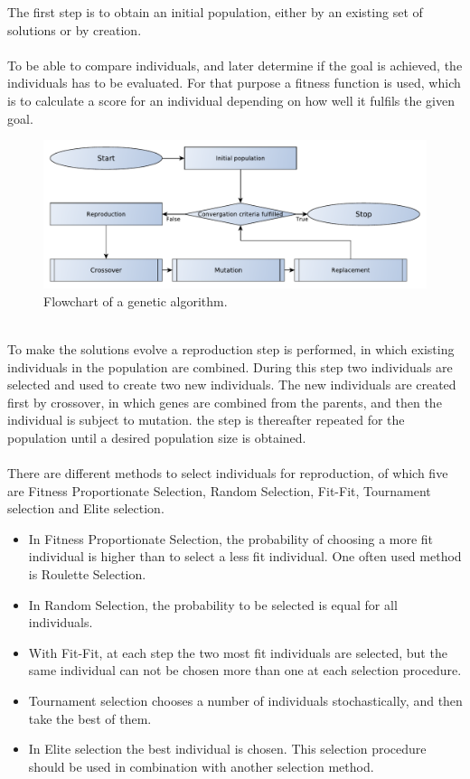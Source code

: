The first step is to obtain an initial population, either by an existing set of solutions or by creation.\\\\
To be able to compare individuals, and later determine if the goal is achieved, the individuals has to be evaluated. For that purpose a fitness function is used, which is to calculate a score for an individual depending on how well it fulfils the given goal.
\begin{figure}[!htb]
	\centering
	\includegraphics[width=\textwidth]{chapter_4_methods/GeneticFlowChart-Generic}
  	\caption[Flowchart of a genetic algorithm]
  	{Flowchart of a genetic algorithm.}
	\label{GeneticFlowChart-generic}
\end{figure}
\\To make the solutions evolve a reproduction step is performed, in which existing individuals in the population are combined. During this step two individuals are selected and used to create two new individuals. The new individuals are created first by crossover, in which genes are combined from the parents, and then the individual is subject to mutation. the step is thereafter repeated for the population until a desired population size is obtained.\\\\
There are different methods to select individuals for reproduction, of which five are Fitness Proportionate Selection, Random Selection, Fit-Fit, Tournament selection and Elite selection.
\begin{itemize}
\item In Fitness Proportionate Selection, the probability of choosing a more fit individual is higher than to select a less fit individual. One often used method is Roulette Selection.%
\item In Random Selection, the probability to be selected is equal for all individuals. 
\item With Fit-Fit, at each step the two most fit individuals are selected, but the same individual can not be chosen more than one at each selection procedure.
\item Tournament selection chooses a number of individuals stochastically, and then take the best of them.
\item In Elite selection the best individual is chosen. This selection procedure should be used in combination with another selection method.
\end{itemize}
